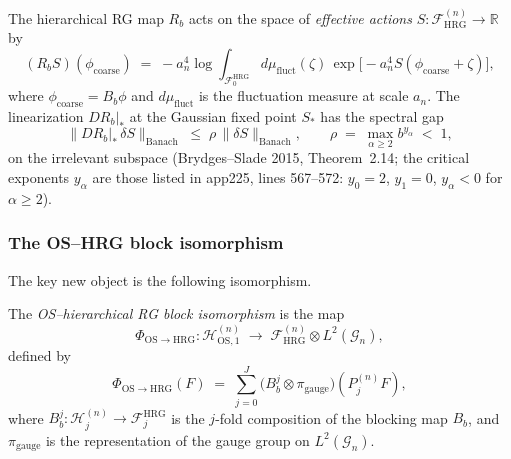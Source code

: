 The hierarchical RG map $R_{b}$ acts on the space of
\emph{effective actions} $S:\mathcal{F}_{\mathrm{HRG}}^{(n)}\to
\mathbb{R}$ by
\begin{equation}
\label{eq:hrg_map}
  (R_{b}S)(\phi_{\mathrm{coarse}})
  \;=\;-a_{n}^{4}\log\int_{\mathcal{F}_{0}^{\mathrm{HRG}}}
  d\mu_{\mathrm{fluct}}(\zeta)\,
  \exp\bigl[-a_{n}^{4}S(\phi_{\mathrm{coarse}}+\zeta)\bigr],
\end{equation}
where $\phi_{\mathrm{coarse}}=B_{b}\phi$ and
$d\mu_{\mathrm{fluct}}$ is the fluctuation measure at scale
$a_{n}$. The linearization $DR_{b}|_{*}$ at the Gaussian fixed
point $S_{*}$ has the spectral gap
\begin{equation}
\label{eq:hrg_spectral_gap}
  \|DR_{b}|_{*}\,\delta S\|_{\mathrm{Banach}}
  \;\le\;\rho\,\|\delta S\|_{\mathrm{Banach}},
  \qquad
  \rho\;=\;\max_{\alpha\ge 2}b^{y_{\alpha}}\;<\;1,
\end{equation}
on the irrelevant subspace
(Brydges--Slade 2015, Theorem~2.14; the critical exponents
$y_{\alpha}$ are those listed in app225, lines 567--572:
$y_{0}=2$, $y_{1}=0$, $y_{\alpha}<0$ for $\alpha\ge 2$).

\subsubsection{The OS--HRG block isomorphism}

The key new object is the following isomorphism.

\begin{definition}
\label{def:os_hrg_iso}
The \emph{OS--hierarchical RG block isomorphism} is the map
\begin{equation}
\label{eq:os_hrg_iso}
  \Phi_{\mathrm{OS}\to\mathrm{HRG}}:
  \mathcal{H}_{\mathrm{OS},1}^{(n)}
  \;\to\;\mathcal{F}_{\mathrm{HRG}}^{(n)}\otimes L^{2}(\mathcal{G}_
  {n}),
\end{equation}
defined by
\begin{equation}
\label{eq:os_hrg_iso_def}
  \Phi_{\mathrm{OS}\to\mathrm{HRG}}(F)
  \;=\;\sum_{j=0}^{J}\bigl(B_{b}^{j}\otimes\pi_{\mathrm{gauge}}
  \bigr)(P_{j}^{(n)}F),
\end{equation}
where $B_{b}^{j}:\mathcal{H}_{j}^{(n)}\to
\mathcal{F}_{j}^{\mathrm{HRG}}$ is the $j$-fold composition of the
blocking map $B_{b}$, and $\pi_{\mathrm{gauge}}$ is the
representation of the gauge group on $L^{2}(\mathcal{G}_{n})$.
\end{definition}

